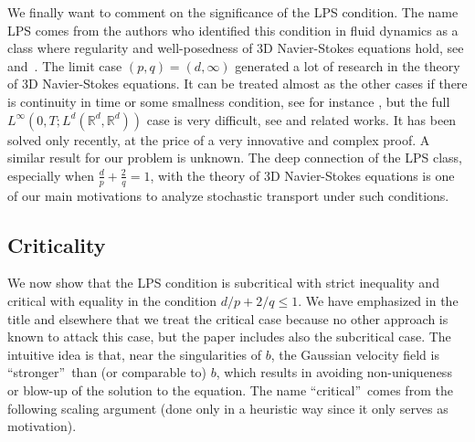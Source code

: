 \documentclass[a4paper,10pt]{article}
\begin{document}
We finally want to comment on the significance of the LPS condition. The name LPS comes from the authors who identified this condition in fluid
dynamics as a class where regularity and well-posedness of 3D Navier-Stokes
equations hold, see \cite{KISLAD57,LIOPRO59,PRODI59,SERRIN62,LADYZ67} and~\cite{Ga}. The limit case $( p,q) =(
d,\infty ) $ generated a lot of research in the theory of 3D
Navier-Stokes equations. It can be treated almost as the other cases 
if there is  continuity in time or some smallness condition, see for instance 
\cite{Be,LIONS96}, but the full $L^{\infty }( 0,T;L^{d}
(\mathbb{R}^{d},\mathbb{R}^{d}))$ case is very difficult, see 
\cite{SeSv} and related works. It has been solved only recently, at the
price of a very innovative and complex proof. A similar result for our
problem is unknown. The deep connection of the LPS class, especially when $\frac{d}{p}+ 
\frac{2}{q}=1$, with the theory of 3D Navier-Stokes equations is one of our
main motivations to analyze stochastic transport under such conditions.

\subsection{Criticality}

We now show that the LPS condition is subcritical with strict inequality and
critical with equality in the condition $d/p + 2/q \leq 1$. 
We have emphasized in the title and elsewhere that
we treat the critical case because no other approach is known to attack this
case, but the paper includes also the subcritical case. The intuitive idea
is that, near the singularities of $b$, the Gaussian velocity field is
\textquotedblleft stronger\textquotedblright\ than (or comparable to) $b$,
which results in avoiding non-uniqueness or blow-up of the solution to the equation. The name
\textquotedblleft critical\textquotedblright\ comes from the following
scaling argument (done only in a heuristic way since it only serves as motivation).
\end{document}
